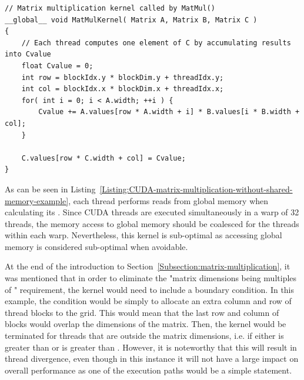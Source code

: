 \begin{lstlisting}[caption={Definition of the matrix multiplication kernel that uses global memory without shared memory. Each thread has a variable \code{Cvalue} stored in registers into which it calculates its specific \code{C(row, col)} matrix element. Taken from Nvidia's \emph{CUDA C++ Programming Guide} \cite{NVIDIAMay2022}.},label={Listing:CUDA-matrix-multiplication-without-shared-memory-example}]
// Matrix multiplication kernel called by MatMul()
__global__ void MatMulKernel( Matrix A, Matrix B, Matrix C )
{
	// Each thread computes one element of C by accumulating results into Cvalue
	float Cvalue = 0;
	int row = blockIdx.y * blockDim.y + threadIdx.y;
	int col = blockIdx.x * blockDim.x + threadIdx.x;
	for( int i = 0; i < A.width; ++i ) {
		Cvalue += A.values[row * A.width + i] * B.values[i * B.width + col];
	}

	C.values[row * C.width + col] = Cvalue;
}
\end{lstlisting}

As can be seen in Listing~\ref{Listing:CUDA-matrix-multiplication-without-shared-memory-example}, each thread performs  reads from global memory when calculating its . Since CUDA threads are executed simultaneously in a warp of 32 threads, the memory access to global memory should be coalesced for the threads within each warp. Nevertheless, this kernel is sub-optimal as accessing global memory is considered sub-optimal when avoidable.
\par At the end of the introduction to Section~\ref{Subsection:matrix-multiplication}, it was mentioned that in order to eliminate the "matrix dimensions being multiples of " requirement, the kernel would need to include a boundary condition. In this example, the condition would be simply to allocate an extra column and row of thread blocks to the grid. This would mean that the last row and column of blocks would overlap the dimensions of the matrix. Then, the kernel would be terminated for threads that are outside the matrix dimensions, i.e. if either  is greater than  or  is greater than . However, it is noteworthy that this will result in thread divergence, even though in this instance it will not have a large impact on overall performance as one of the execution paths would be a simple  statement.

